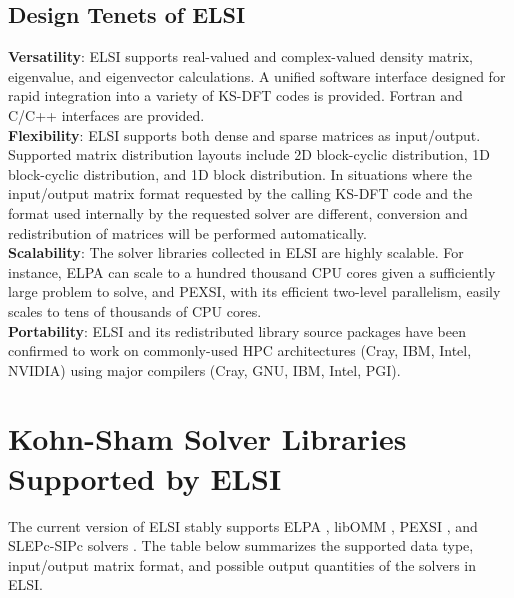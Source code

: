 \documentclass{report}
\begin{document}
\subsection{Design Tenets of ELSI}
\label{subsec:elsi_design}
\textbf{Versatility}:  ELSI supports real-valued and complex-valued density matrix, eigenvalue, and eigenvector calculations.  A unified software interface designed for rapid integration into a variety of KS-DFT codes is provided.  Fortran and C/C++ interfaces are provided.\\

\textbf{Flexibility}:  ELSI supports both dense and sparse matrices as input/output.  Supported matrix distribution layouts include 2D block-cyclic distribution, 1D block-cyclic distribution, and 1D block distribution.  In situations where the input/output matrix format requested by the calling KS-DFT code and the format used internally by the requested solver are different, conversion and redistribution of matrices will be performed automatically.\\

\textbf{Scalability}:  The solver libraries collected in ELSI are highly scalable.  For instance, ELPA can scale to a hundred thousand CPU cores given a sufficiently large problem to solve, and PEXSI, with its efficient two-level parallelism, easily scales to tens of thousands of CPU cores.\\

\textbf{Portability}:  ELSI and its redistributed library source packages have been confirmed to work on commonly-used HPC architectures (Cray, IBM, Intel, NVIDIA) using major compilers (Cray, GNU, IBM, Intel, PGI).\\

\section{Kohn-Sham Solver Libraries Supported by ELSI}
\label{sec:solvers}
The current version of ELSI stably supports ELPA \cite{elpa_auckenthaler_2011,elpa_marek_2014}, libOMM \cite{libomm_corsetti_2014}, PEXSI \cite{pexsi_lin_2009,pexsi_lin_2013}, and SLEPc-SIPc solvers \cite{slepc_hernandez_2005,sips_keceli_2016}.  The table below summarizes the supported data type, input/output matrix format, and possible output quantities of the solvers in ELSI.\\
\end{document}
